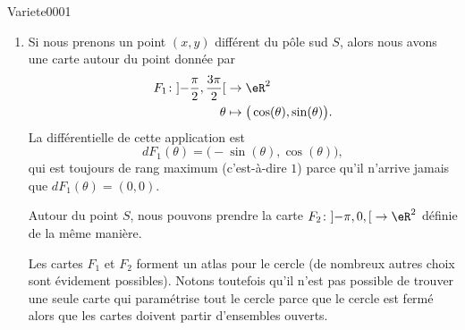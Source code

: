 
\begin{corrige}{Variete0001}

	\begin{enumerate}

		\item
		      Si nous prenons un point $(x,y)$ différent du pôle sud $S$, alors nous avons une carte autour du point donnée par
		      \begin{equation}
			      \begin{aligned}
				      F_1\colon \mathopen] -\frac{ \pi }{2} , \frac{ 3\pi }{ 2 } \mathclose[ & \to \eR^2                                      \\
				      \theta                                                                 & \mapsto \big( \cos(\theta),\sin(\theta) \big).
			      \end{aligned}
		      \end{equation}
		      La différentielle de cette application est
		      \begin{equation}
			      dF_1(\theta)=\big( -\sin(\theta),\cos(\theta) \big),
		      \end{equation}
		      qui est toujours de rang maximum (c'est-à-dire $1$) parce qu'il n'arrive jamais que $dF_1(\theta)=(0,0)$.

		      Autour du point $S$, nous pouvons prendre la carte $F_2\colon \mathopen] -\pi,0 ,  \mathclose[\to \eR^2$ définie de la même manière.

		      Les cartes $F_1$ et $F_2$ forment un atlas pour le cercle (de nombreux autres choix sont évidement possibles). Notons toutefois qu'il n'est pas possible de trouver une seule carte qui paramétrise tout le cercle parce que le cercle est fermé alors que les cartes doivent partir d'ensembles ouverts.


\end{enumerate}
\end{corrige}
